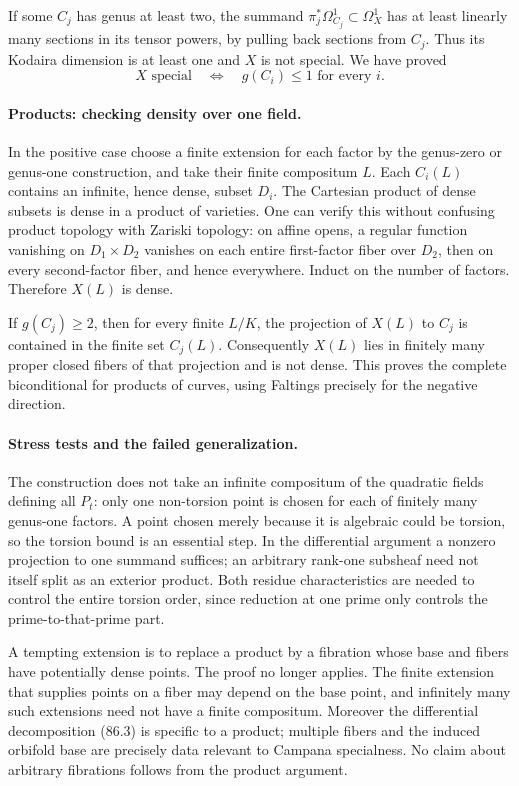 \documentclass[11pt]{article}
\begin{document}
If some $C_j$ has genus at least two, the summand $\pi_j^*\Omega^1_{C_j}\subset\Omega_X^1$ has at least linearly many sections in its tensor powers, by pulling back sections from $C_j$. Thus its Kodaira dimension is at least one and $X$ is not special. We have proved
\[
 X\text{ special}\quad\Longleftrightarrow\quad
 g(C_i)\le1\text{ for every }i.
 \tag{86.4}
\]

\paragraph{Products: checking density over one field.}
In the positive case choose a finite extension for each factor by the genus-zero or genus-one construction, and take their finite compositum $L$. Each $C_i(L)$ contains an infinite, hence dense, subset $D_i$. The Cartesian product of dense subsets is dense in a product of varieties. One can verify this without confusing product topology with Zariski topology: on affine opens, a regular function vanishing on $D_1\times D_2$ vanishes on each entire first-factor fiber over $D_2$, then on every second-factor fiber, and hence everywhere. Induct on the number of factors. Therefore $X(L)$ is dense.

If $g(C_j)\ge2$, then for every finite $L/K$, the projection of $X(L)$ to $C_j$ is contained in the finite set $C_j(L)$. Consequently $X(L)$ lies in finitely many proper closed fibers of that projection and is not dense. This proves the complete biconditional for products of curves, using Faltings precisely for the negative direction.

\paragraph{Stress tests and the failed generalization.}
The construction does not take an infinite compositum of the quadratic fields defining all $P_t$: only one non-torsion point is chosen for each of finitely many genus-one factors. A point chosen merely because it is algebraic could be torsion, so the torsion bound is an essential step. In the differential argument a nonzero projection to one summand suffices; an arbitrary rank-one subsheaf need not itself split as an exterior product. Both residue characteristics are needed to control the entire torsion order, since reduction at one prime only controls the prime-to-that-prime part.

A tempting extension is to replace a product by a fibration whose base and fibers have potentially dense points. The proof no longer applies. The finite extension that supplies points on a fiber may depend on the base point, and infinitely many such extensions need not have a finite compositum. Moreover the differential decomposition (86.3) is specific to a product; multiple fibers and the induced orbifold base are precisely data relevant to Campana specialness. No claim about arbitrary fibrations follows from the product argument.
\end{document}
